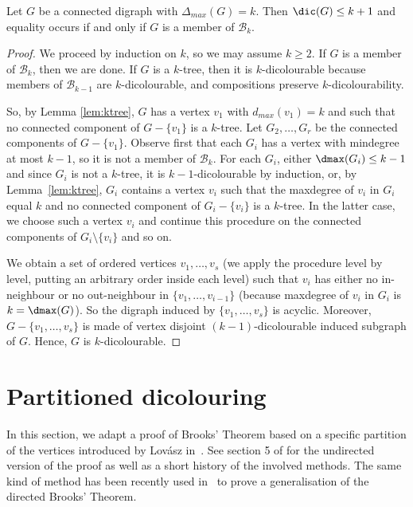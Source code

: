 \begin{theorem}
Let $G$ be a connected digraph with $\Delta_{max}(G) = k$.
Then $\dic(G) \leq k+1$
and equality occurs if and only if $G$ is a member of $\mathcal B_k$. 
\end{theorem}

\begin{proof} 
We proceed by induction on $k$, so we may assume $k \geq 2$. 
If $G$ is a member of $\mathcal B_k$, then we are done.  If $G$ is a $k$-tree, then it is $k$-dicolourable because members of $\mathcal B_{k-1}$ are $k$-dicolourable, and compositions preserve $k$-dicolourability. 

So, by Lemma \ref{lem:ktree}, $G$ has a vertex $v_1$ with $d_{max}(v_1) = k$ and such that no connected component of $G-\{v_1\}$ is a $k$-tree. Let $G_2, \dots, G_r$ be the connected components of $G - \{v_1\}$. 
Observe first that each $G_i$ has a vertex with mindegree at most $k-1$, so it is not a member of $\mathcal B_k$. 
For each $G_i$, either $\dmax(G_i) \leq k-1 $ and since $G_i$ is not a $k$-tree, it is $k-1$-dicolourable by induction, or, by Lemma~\ref{lem:ktree}, $G_i$ contains a vertex $v_i$ such that the maxdegree of $v_i$ in $G_i$ equal $k$ and no connected component of $G_i - \{v_i\}$ is a $k$-tree. In the latter case, we choose such a vertex $v_i$ and continue this procedure on the connected components of $G_i \setminus \{v_i\}$ and so on. 

We obtain a set of ordered vertices $v_1, \dots, v_s$ (we apply the procedure level by level, putting an arbitrary order inside each level) such that $v_i$ has either no in-neighbour or no out-neighbour in $\{v_1, \dots, v_{i-1}\}$ (because maxdegree of $v_i$ in $G_i$ is $k = \dmax(G)$). So the digraph induced by $\{v_1, \dots, v_s\}$ is acyclic. 
Moreover, $G-\{v_1, \dots, v_s\}$ is made of vertex disjoint $(k-1)$-dicolourable induced subgraph of $G$. Hence, $G$ is $k$-dicolourable.  
\end{proof}


\section{Partitioned dicolouring}
In this section, we adapt a proof of Brooks' Theorem based on a specific partition of the vertices introduced by Lov\'asz in~\cite{L66}.  See section 5 of \cite{CR14} for the undirected version of the proof as well as a short history of the involved methods. The same kind of method has been recently used in~\cite{BSS21} to prove a generalisation of the directed Brooks' Theorem. 

